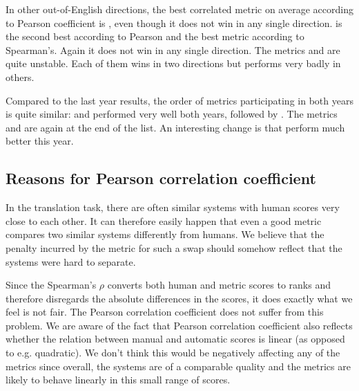 In other out-of-English directions, the best correlated metric on average according
to Pearson coefficient is , even though it does not win in any
single direction.  is the second best according to Pearson
and the best metric according to Spearman's. Again it does not win in any
single direction. The metrics  and  are quite
unstable.  Each of them wins in two directions but performs very badly in
others.

Compared to the last year results, the order of metrics participating in both
years is quite similar:  and  performed very well
both years, followed by . The metrics  and 
are again at the end of the list. An interesting change is that
 perform much better this year.

\subsection{Reasons for Pearson correlation coefficient}

In the translation task, there are often similar systems with human scores very
close to each other. It can therefore easily happen that even a good metric
compares two similar systems differently from humans. We believe that the
penalty incurred by the metric for such a swap should somehow reflect that the
systems were hard to separate.

Since the Spearman's $\rho$ converts both human and metric scores to ranks and
therefore disregards the absolute differences in the scores, it does exactly what
we feel is not fair. The Pearson correlation coefficient does not suffer from this 
problem. We are aware of the fact that Pearson correlation coefficient also
reflects whether the relation between manual and automatic scores is linear (as
opposed to e.g. quadratic). We don't think this would be negatively affecting
any of the metrics since overall, the systems are of a comparable quality and
the metrics are likely to behave linearly in this small
range of scores.

